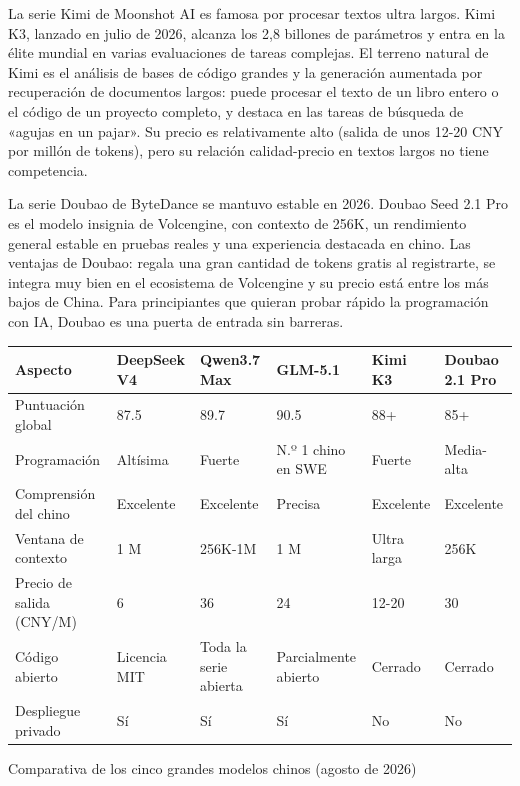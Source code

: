 
La serie Kimi de Moonshot AI es famosa por procesar textos ultra largos. Kimi K3, lanzado en julio de 2026, alcanza los 2,8 billones de parámetros y entra en la élite mundial en varias evaluaciones de tareas complejas. El terreno natural de Kimi es el análisis de bases de código grandes y la generación aumentada por recuperación de documentos largos: puede procesar el texto de un libro entero o el código de un proyecto completo, y destaca en las tareas de búsqueda de «agujas en un pajar». Su precio es relativamente alto (salida de unos 12-20 CNY por millón de tokens), pero su relación calidad-precio en textos largos no tiene competencia.


La serie Doubao de ByteDance se mantuvo estable en 2026. Doubao Seed 2.1 Pro es el modelo insignia de Volcengine, con contexto de 256K, un rendimiento general estable en pruebas reales y una experiencia destacada en chino. Las ventajas de Doubao: regala una gran cantidad de tokens gratis al registrarte, se integra muy bien en el ecosistema de Volcengine y su precio está entre los más bajos de China. Para principiantes que quieran probar rápido la programación con IA, Doubao es una puerta de entrada sin barreras.

\begin{center}
\begin{tabularx}{\linewidth}{|X|X|X|X|X|X|}
\hline
\textbf{Aspecto} & \textbf{DeepSeek V4} & \textbf{Qwen3.7 Max} & \textbf{GLM-5.1} & \textbf{Kimi K3} & \textbf{Doubao 2.1 Pro} \tabularnewline
\hline
Puntuación global & 87.5 & 89.7 & 90.5 & 88+ & 85+ \tabularnewline
Programación & Altísima & Fuerte & N.º 1 chino en SWE & Fuerte & Media-alta \tabularnewline
Comprensión del chino & Excelente & Excelente & Precisa & Excelente & Excelente \tabularnewline
Ventana de contexto & 1 M & 256K-1M & 1 M & Ultra larga & 256K \tabularnewline
Precio de salida (CNY/M) & 6 & 36 & 24 & 12-20 & 30 \tabularnewline
Código abierto & Licencia MIT & Toda la serie abierta & Parcialmente abierto & Cerrado & Cerrado \tabularnewline
Despliegue privado & Sí & Sí & Sí & No & No \tabularnewline
\hline
\end{tabularx}
\end{center}

\begin{center}\small\color{gray}Comparativa de los cinco grandes modelos chinos (agosto de 2026)\end{center}


